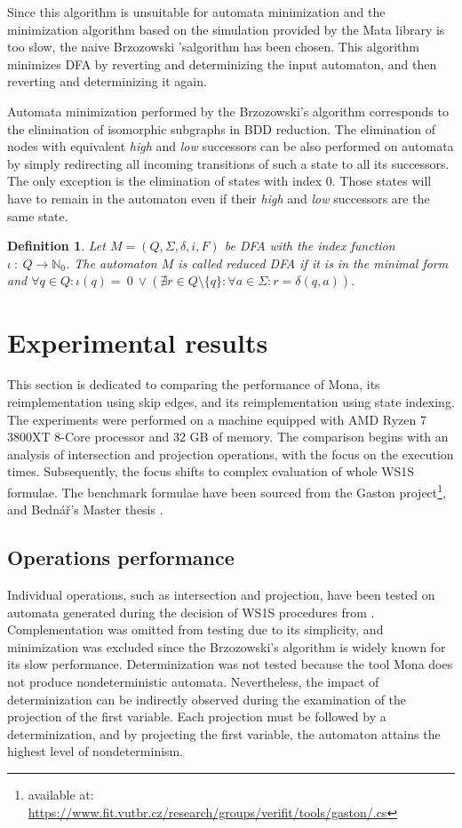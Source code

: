 \documentclass[pdflatex,sn-mathphys-num]{sn-jnl}%
\theoremstyle{thmstyleone}%
\theoremstyle{thmstyletwo}%
\theoremstyle{thmstylethree}%
\newtheorem{definition}{Definition}%
\begin{document}
        Since this algorithm is unsuitable for automata minimization and the minimization algorithm based on the simulation provided by the Mata library is too slow, the naive Brzozowski 'salgorithm \cite{Brzozowski} has been chosen. This algorithm minimizes DFA by reverting and determinizing the input automaton, and then reverting and determinizing it again.

        Automata minimization performed by the Brzozowski's algorithm corresponds to the elimination of isomorphic subgraphs in BDD reduction. The elimination of nodes with equivalent \textit{high} and \textit{low} successors can be also performed on automata by simply redirecting all incoming transitions of such a state to all its successors. The only exception is the elimination of states with index $0$. Those states will have to remain in the automaton even if their \textit{high} and \textit{low} successors are the same state.

        \vspace*{0.5em}

        \begin{definition}
            Let $M = (Q, \Sigma, \delta, i, F)$ be DFA with the index function $\iota ~:~Q \rightarrow \mathbb{N}_0$. The automaton $M$ is called reduced DFA if it is in the minimal form and $\forall q \in Q : \iota(q) =~0~\lor (\nexists r \in Q\setminus\{q\} : \forall a \in \Sigma : r = \delta(q, a))$.
        \end{definition}

\section{Experimental results}
    This section is dedicated to comparing the performance of Mona, its reimplementation using skip edges, and its reimplementation using state indexing. The experiments were performed on a machine equipped with AMD Ryzen 7 3800XT 8-Core processor and 32 GB of memory. The comparison begins with an analysis of intersection and projection operations, with the focus on the execution times. Subsequently, the focus shifts to complex evaluation of whole WS1S formulae. The benchmark formulae have been sourced from the Gaston project\footnote{available at: \url{https://www.fit.vutbr.cz/research/groups/verifit/tools/gaston/.cs}}, and Bednář's Master thesis \cite{Bednar}.
    \subsection{Operations performance}
        Individual operations, such as intersection and projection, have been tested on automata generated during the decision of WS1S procedures from \cite{Bednar}. Complementation was omitted from testing due to its simplicity, and minimization was excluded since the Brzozowski's algorithm is widely known for its slow performance. Determinization was not tested because the tool Mona does not produce nondeterministic automata. Nevertheless, the impact of determinization can be indirectly observed during the examination of the projection of the first variable. Each projection must be followed by a determinization, and by projecting the first variable, the automaton attains the highest level of nondeterminism.
\end{document}
